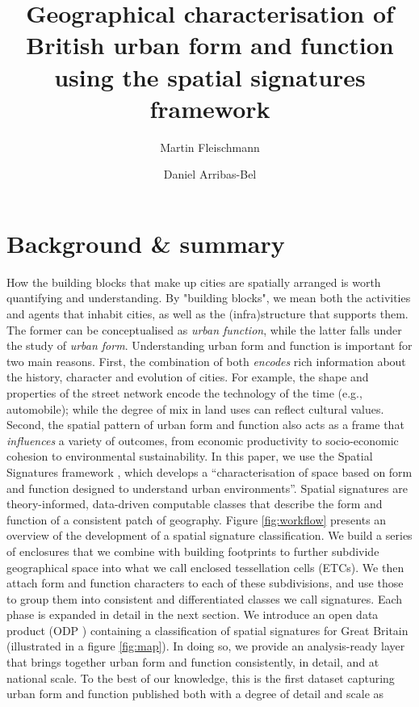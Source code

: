 \documentclass[fleqn,10pt]{wlscirep}
\title{Geographical characterisation of British urban form and function using
the spatial signatures framework}
\author[1, *]{Martin Fleischmann}
\author[1]{Daniel Arribas-Bel}
\affil[1]{Geographic Data Science Lab, Department of Geography and Planning, University
of Liverpool, Roxby Building, 74 Bedford St S, Liverpool, L69 7ZT, United Kingdom}
\affil[*]{corresponding author(s): Martin Fleischmann (m.fleischmann@liverpool.ac.uk)}
\begin{document}
\flushbottom
\maketitle
\thispagestyle{empty}
\section*{Background \& summary}
How the building blocks that make up cities are spatially arranged is worth
quantifying and understanding.
By "building blocks", we mean both the activities and agents that inhabit
cities, as well as the (infra)structure that supports them. The
former can be conceptualised as \textit{urban function}, while the latter
falls under the study of \textit{urban form}.
Understanding urban form and function is important for two main reasons.
First, the combination of both \textit{encodes} rich information about the
history, character and evolution of cities.
For example, the shape and properties of the street network encode the technology of the
time (e.g., automobile); while the degree of mix in land uses can reflect
cultural values.
Second, the spatial pattern of urban form and function also acts as a
frame that \textit{influences} a variety of outcomes, from economic
productivity to socio-economic cohesion to environmental sustainability.
In this paper, we use the Spatial Signatures framework \cite{dab_mf_2021a, dab_mf_2021b},
which develops a ``characterisation of space based on form and function
designed to understand urban environments''\cite{dab_mf_2021a}.
Spatial signatures are theory-informed, data-driven computable classes that
describe the form and function of a consistent patch of geography.
Figure \ref{fig:workflow} presents an overview of the development of a spatial
signature classification.
We build a series of enclosures that we combine with building footprints
to further subdivide geographical space into what we call enclosed tessellation cells (ETCs). We then attach form and function
characters to each of these subdivisions, and use those to group them into
consistent and differentiated classes we call signatures.
Each phase is expanded in detail in the next section.
We introduce an open data product (ODP \cite{odp_paper21}) containing a classification of
spatial signatures for Great Britain (illustrated in a figure \ref{fig:map}). In doing so, we provide an
analysis-ready layer that brings together urban form and function consistently, in
detail, and at national scale. To the best of our knowledge, this is the first
dataset capturing urban form and function published both with a degree of detail and scale as
\end{document}
